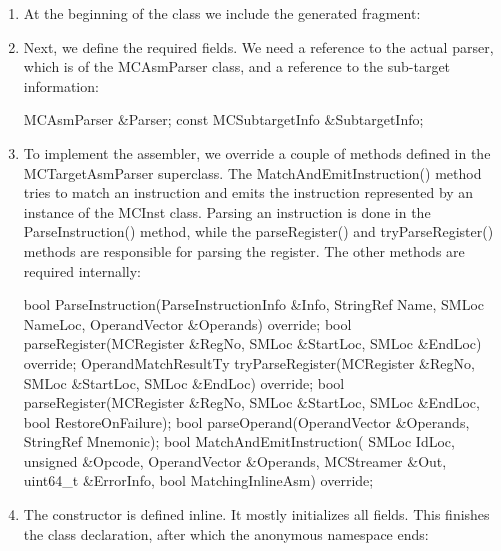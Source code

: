 \begin{enumerate}
\item
At the beginning of the class we include the generated fragment:

\begin{cpp}
class M88kAsmParser : public MCTargetAsmParser {
#define GET_ASSEMBLER_HEADER
#include "M88kGenAsmMatcher.inc"
\end{cpp}

\item
Next, we define the required fields. We need a reference to the actual parser, which is of the MCAsmParser class, and a reference to the sub-target information:

\begin{cpp}
    MCAsmParser &Parser;
    const MCSubtargetInfo &SubtargetInfo;
\end{cpp}

\item
To implement the assembler, we override a couple of methods defined in the MCTargetAsmParser superclass. The MatchAndEmitInstruction() method tries to match an instruction and emits the instruction represented by an instance of the MCInst class. Parsing an instruction is done in the ParseInstruction() method, while the parseRegister() and tryParseRegister() methods are responsible for parsing the register. The other methods are required internally:

\begin{cpp}
    bool
    ParseInstruction(ParseInstructionInfo &Info,
                    StringRef Name, SMLoc NameLoc,
                    OperandVector &Operands) override;
    bool parseRegister(MCRegister &RegNo, SMLoc &StartLoc,
                        SMLoc &EndLoc) override;
    OperandMatchResultTy
    tryParseRegister(MCRegister &RegNo, SMLoc &StartLoc,
                    SMLoc &EndLoc) override;
    bool parseRegister(MCRegister &RegNo, SMLoc &StartLoc,
                        SMLoc &EndLoc,
                        bool RestoreOnFailure);
    bool parseOperand(OperandVector &Operands,
                        StringRef Mnemonic);
    bool MatchAndEmitInstruction(
        SMLoc IdLoc, unsigned &Opcode,
        OperandVector &Operands, MCStreamer &Out,
        uint64_t &ErrorInfo,
        bool MatchingInlineAsm) override;
\end{cpp}

\item
The constructor is defined inline. It mostly initializes all fields. This finishes the class declaration, after which the anonymous namespace ends:


\end{enumerate}
